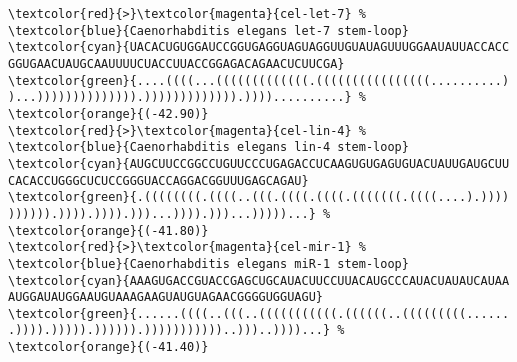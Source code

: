 \documentclass{article}
\begin{document}
\pagestyle{empty}
  \begin{Verbatim}[frame=single,commentchar=\%,fontsize=\relscale{0.76}]
\textcolor{red}{>}\textcolor{magenta}{cel-let-7} %
\textcolor{blue}{Caenorhabditis elegans let-7 stem-loop}
\textcolor{cyan}{UACACUGUGGAUCCGGUGAGGUAGUAGGUUGUAUAGUUUGGAAUAUUACCACC
GGUGAACUAUGCAAUUUUCUACCUUACCGGAGACAGAACUCUUCGA}
\textcolor{green}{....((((...(((((((((((((.((((((((((((((((..........)
)...)))))))))))))).))))))))))))).))))..........} %
\textcolor{orange}{(-42.90)}
\textcolor{red}{>}\textcolor{magenta}{cel-lin-4} %
\textcolor{blue}{Caenorhabditis elegans lin-4 stem-loop}
\textcolor{cyan}{AUGCUUCCGGCCUGUUCCCUGAGACCUCAAGUGUGAGUGUACUAUUGAUGCUU
CACACCUGGGCUCUCCGGGUACCAGGACGGUUUGAGCAGAU}
\textcolor{green}{.((((((((.((((..(((.((((.((((.(((((((.((((....).))))
)))))).)))).)))).)))...)))).)))...)))))...} %
\textcolor{orange}{(-41.80)}
\textcolor{red}{>}\textcolor{magenta}{cel-mir-1} %
\textcolor{blue}{Caenorhabditis elegans miR-1 stem-loop}
\textcolor{cyan}{AAAGUGACCGUACCGAGCUGCAUACUUCCUUACAUGCCCAUACUAUAUCAUAA
AUGGAUAUGGAAUGUAAAGAAGUAUGUAGAACGGGGUGGUAGU}
\textcolor{green}{......((((..(((..(((((((((((.((((((..(((((((((......
.)))).))))).)))))).)))))))))))..)))..))))...} %
\textcolor{orange}{(-41.40)}
\end{Verbatim}
\end{document}
